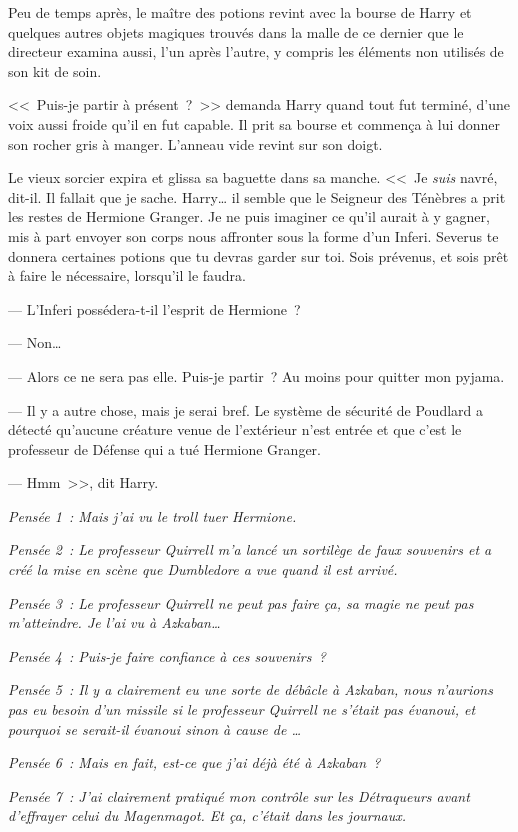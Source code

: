 Peu de temps après, le maître des potions revint avec la bourse de Harry et quelques autres objets magiques trouvés dans la malle de ce dernier que le directeur examina aussi, l'un après l'autre, y compris les éléments non utilisés de son kit de soin.

<<~Puis-je partir à présent~?~>> demanda Harry quand tout fut terminé, d'une voix aussi froide qu'il en fut capable. Il prit sa bourse et commença à lui donner son rocher gris à manger. L'anneau vide revint sur son doigt.

Le vieux sorcier expira et glissa sa baguette dans sa manche. <<~Je \emph{suis} navré, dit-il. Il fallait que je sache. Harry… il semble que le Seigneur des Ténèbres a prit les restes de Hermione Granger. Je ne puis imaginer ce qu'il aurait à y gagner, mis à part envoyer son corps nous affronter sous la forme d'un Inferi. Severus te donnera certaines potions que tu devras garder sur toi. Sois prévenus, et sois prêt à faire le nécessaire, lorsqu'il le faudra.

--- L'Inferi possédera-t-il l'esprit de Hermione~?

--- Non…

--- Alors ce ne sera pas elle. Puis-je partir~? Au moins pour quitter mon pyjama.

--- Il y a autre chose, mais je serai bref. Le système de sécurité de Poudlard a détecté qu'aucune créature venue de l'extérieur n'est entrée et que c'est le professeur de Défense qui a tué Hermione Granger.

--- Hmm~>>, dit Harry.

\emph{Pensée 1~: Mais j'ai vu le troll tuer Hermione.}

\emph{Pensée 2~: Le professeur Quirrell m'a lancé un sortilège de faux souvenirs et a créé la mise en scène que Dumbledore a vue quand il est arrivé.}

\emph{Pensée 3~: Le professeur Quirrell ne peut pas faire ça, sa magie ne peut pas m'atteindre. Je l'ai vu à Azkaban…}

\emph{Pensée 4~: Puis-je faire confiance à ces souvenirs~?}

\emph{Pensée 5~: Il y a clairement eu une sorte de débâcle à Azkaban, nous n'aurions pas eu besoin d'un missile si le professeur Quirrell ne s'était pas évanoui, et pourquoi se serait-il évanoui sinon à cause de …}

\emph{Pensée 6~: Mais en fait, est-ce que j'ai déjà été à Azkaban~?}

\emph{Pensée 7~: J'ai clairement pratiqué mon contrôle sur les Détraqueurs avant d'effrayer celui du Magenmagot. Et \emph{ça}, c'était dans les journaux.}


